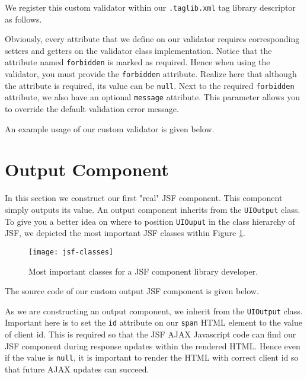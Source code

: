 We register this custom validator within our \texttt{.taglib.xml} tag library descriptor as follows.

Obviously, every attribute that we define on our validator requires corresponding setters and getters on the validator class implementation.
Notice that the attribute named \texttt{forbidden} is marked as required.
Hence when using the validator, you must provide the \texttt{forbidden} attribute.
Realize here that although the attribute is required, its value can be \texttt{null}.
Next to the required \texttt{forbidden} attribute, we also have an optional \texttt{message} attribute.
This parameter allows you to override the default validation error message.

An example usage of our custom validator is given below.


\section{Output Component}
In this section we construct our first "real" JSF component.
This component simply outputs its value.
An output component inherits from the \texttt{UIOutput} class.
To give you a better idea on where to position \texttt{UIOuput} in the class hierarchy of JSF,
we depicted the most important JSF classes within Figure \ref{fig:jsf-classes}.
\begin{figure}[htbp]
	\begin{center}
		\texttt{[image: jsf-classes]}
		\caption{Most important classes for a JSF component library developer.}
		\label{fig:jsf-classes}
	\end{center}
\end{figure}

The source code of our custom output JSF component is given below.

As we are constructing an output component, we inherit from the \texttt{UIOutput} class.
Important here is to set the \texttt{id} attribute on our \texttt{span} HTML element to the value of client id.
This is required so that the JSF AJAX Javascript code can find our JSF component during response updates within the rendered HTML.
Hence even if the value is \texttt{null}, it is important to render the HTML with correct client id so that future AJAX updates can succeed.

